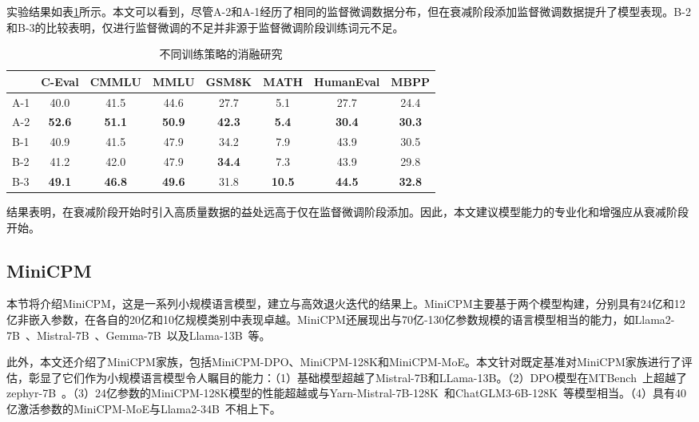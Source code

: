 实验结果如表\ref{tab:dataexperiments}所示。本文可以看到，尽管A-2和A-1经历了相同的监督微调数据分布，但在衰减阶段添加监督微调数据提升了模型表现。B-2和B-3的比较表明，仅进行监督微调的不足并非源于监督微调阶段训练词元不足。 

\begin{table}[h]
\centering
\begin{tabular}{lccccccc}
\toprule
            & \textbf{C-Eval} & \textbf{CMMLU} & \textbf{MMLU} & \textbf{GSM8K} & \textbf{MATH} & \textbf{HumanEval} & \textbf{MBPP} \\ \midrule
A-1 & 40.0  & 41.5  & 44.6 & 27.7  & 5.1  & 27.7      & 24.4 \\
A-2 & \textbf{52.6}  & \textbf{51.1} & \textbf{50.9} & \textbf{42.3 } & \textbf{5.4}  & \textbf{30.4 }     & \textbf{30.3} \\
\midrule

B-1 &   40.9  & 41.5 & 47.9 &  34.2 & 7.9   &  43.9 & 30.5 \\
B-2 &  41.2 &  42.0 &    47.9  & \textbf{34.4} & 7.3 &  43.9 & 29.8  \\ 
B-3 & \textbf{49.1}  & \textbf{46.8}  & \textbf{49.6} & 31.8  & \textbf{10.5}  & \textbf{44.5}  & \textbf{32.8}\\
\bottomrule
\end{tabular}
\caption{不同训练策略的消融研究
}
\label{tab:dataexperiments}
\end{table}

结果表明，在衰减阶段开始时引入高质量数据的益处远高于仅在监督微调阶段添加。因此，本文建议模型能力的专业化和增强应从衰减阶段开始。 

\subsection{MiniCPM}


本节将介绍MiniCPM，这是一系列小规模语言模型，建立与高效退火迭代的结果上。MiniCPM主要基于两个模型构建，分别具有24亿和12亿非嵌入参数，在各自的20亿和10亿规模类别中表现卓越。MiniCPM还展现出与70亿-130亿参数规模的语言模型相当的能力，如Llama2-7B~\citep{touvron2023llama}、Mistral-7B~\citep{jiang2023mistral}、Gemma-7B~\citep{Banks2024Gemma}以及Llama-13B~\citep{touvron2023llama}等。

此外，本文还介绍了MiniCPM家族，包括MiniCPM-DPO、MiniCPM-128K和MiniCPM-MoE。本文针对既定基准对MiniCPM家族进行了评估，彰显了它们作为小规模语言模型令人瞩目的能力：（1）基础模型超越了Mistral-7B和LLama-13B。（2）DPO模型在MTBench~\citep{zheng2024judging}上超越了zephyr-7B~\citep{tunstall2023zephyr}。（3）24亿参数的MiniCPM-128K模型的性能超越或与Yarn-Mistral-7B-128K~\citep{peng2023yarn}和ChatGLM3-6B-128K~\citep{du2021glm}等模型相当。（4）具有40亿激活参数的MiniCPM-MoE与Llama2-34B~\citep{touvron2023llama}不相上下。

